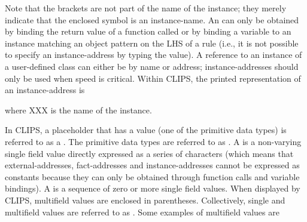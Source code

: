 \documentclass[letterpaper,10pt,english]{sphinxmanual}
\begin{document}
\begin{sphinxVerbatim}[commandchars=\\\{\}]
\PYG{p}{[}\PYG{p}{]} \PYG{p}{[}\PYG{p}{]} \PYG{p}{[}\PYG{p}{]} \PYG{p}{[}\PYG{p}{]}
\end{sphinxVerbatim}

Note that the brackets are not part of the name of the instance; they
merely indicate that the enclosed symbol is an instance-name. An
 can only be obtained by binding the return value of
a function called  or by binding a variable to an
instance matching an object pattern on the LHS of a rule (i.e., it is
not possible to specify an instance-address by typing the value). A
reference to an instance of a user-defined class can either be by name
or address; instance-addresses should only be used when speed is
critical. Within CLIPS, the printed representation of an
instance-address is

\begin{sphinxVerbatim}[commandchars=\\\{\}]
\end{sphinxVerbatim}

where XXX is the name of the instance.

In CLIPS, a placeholder that has a value (one of the primitive data
types) is referred to as a . The primitive data types are
referred to as . A  is a non-varying
single field value directly expressed as a series of characters (which
means that external-addresses, fact-addresses and instance-addresses
cannot be expressed as constants because they can only be obtained
through function calls and variable bindings). A  is
a sequence of zero or more single field values. When displayed by CLIPS,
multifield values are enclosed in parentheses. Collectively, single and
multifield values are referred to as . Some examples of
multifield values are

\begin{sphinxVerbatim}[commandchars=\\\{\}]
        
\end{sphinxVerbatim}
\end{document}
